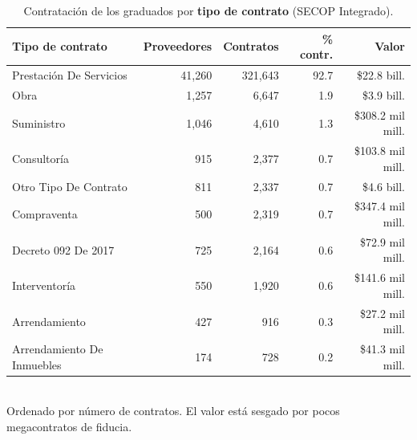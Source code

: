 \begin{table}[H]\centering\footnotesize
\caption{Contratación de los graduados por \textbf{tipo de contrato} (SECOP Integrado).}\label{tab:secop_tipo}
\begin{tabular}{lrrrr}
\toprule
\rowcolor{ustaazul}\textbf{\color{white}Tipo de contrato} & \textbf{\color{white}Proveedores} & \textbf{\color{white}Contratos} & \textbf{\color{white}\% contr.} & \textbf{\color{white}Valor} \\
\midrule
Prestación De Servicios & 41,260 & 321,643 & 92.7 & \$22.8 bill. \\
Obra & 1,257 & 6,647 & 1.9 & \$3.9 bill. \\
Suministro & 1,046 & 4,610 & 1.3 & \$308.2 mil mill. \\
Consultoría & 915 & 2,377 & 0.7 & \$103.8 mil mill. \\
Otro Tipo De Contrato & 811 & 2,337 & 0.7 & \$4.6 bill. \\
Compraventa & 500 & 2,319 & 0.7 & \$347.4 mil mill. \\
Decreto 092 De 2017 & 725 & 2,164 & 0.6 & \$72.9 mil mill. \\
Interventoría & 550 & 1,920 & 0.6 & \$141.6 mil mill. \\
Arrendamiento & 427 & 916 & 0.3 & \$27.2 mil mill. \\
Arrendamiento De Inmuebles & 174 & 728 & 0.2 & \$41.3 mil mill. \\
\bottomrule
\end{tabular}
\\[2pt]{\scriptsize\color{ustagris} Ordenado por número de contratos. El valor está sesgado por pocos megacontratos de fiducia.}
\end{table}